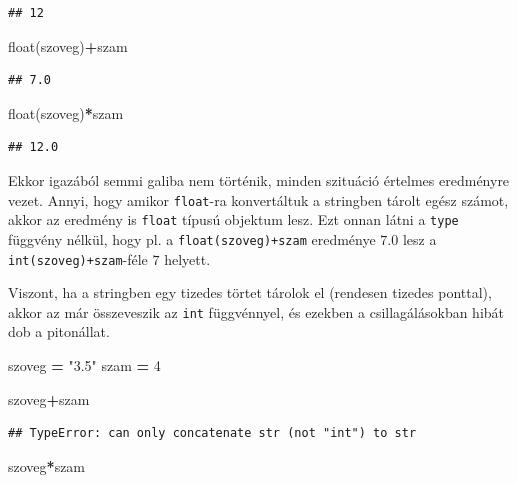 \documentclass[
]{book}
\newenvironment{Shaded}{\begin{snugshade}}{\end{snugshade}}
\newcommand{\BuiltInTok}[1]{#1}
\newcommand{\DecValTok}[1]{\textcolor[rgb]{0.00,0.00,0.81}{#1}}
\newcommand{\NormalTok}[1]{#1}
\newcommand{\OperatorTok}[1]{\textcolor[rgb]{0.81,0.36,0.00}{\textbf{#1}}}
\newcommand{\StringTok}[1]{\textcolor[rgb]{0.31,0.60,0.02}{#1}}
\begin{document}
\begin{verbatim}
## 12
\end{verbatim}

\begin{Shaded}
\begin{Highlighting}[]
\BuiltInTok{float}\NormalTok{(szoveg)}\OperatorTok{+}\NormalTok{szam}
\end{Highlighting}
\end{Shaded}

\begin{verbatim}
## 7.0
\end{verbatim}

\begin{Shaded}
\begin{Highlighting}[]
\BuiltInTok{float}\NormalTok{(szoveg)}\OperatorTok{*}\NormalTok{szam}
\end{Highlighting}
\end{Shaded}

\begin{verbatim}
## 12.0
\end{verbatim}

Ekkor igazából semmi galiba nem történik, minden szituáció értelmes eredményre vezet. Annyi, hogy amikor \texttt{float}-ra konvertáltuk a stringben tárolt egész számot, akkor az eredmény is \texttt{float} típusú objektum lesz. Ezt onnan látni a \texttt{type} függvény nélkül, hogy pl. a \texttt{float(szoveg)+szam} eredménye \(7.0\) lesz a \texttt{int(szoveg)+szam}-féle \(7\) helyett.

Viszont, ha a stringben egy tizedes törtet tárolok el (rendesen tizedes ponttal), akkor az már összeveszik az \texttt{int} függvénnyel, és ezekben a csillagálásokban hibát dob a pitonállat.

\begin{Shaded}
\begin{Highlighting}[]
\NormalTok{szoveg }\OperatorTok{=} \StringTok{"3.5"}
\NormalTok{szam }\OperatorTok{=} \DecValTok{4}

\NormalTok{szoveg}\OperatorTok{+}\NormalTok{szam}
\end{Highlighting}
\end{Shaded}

\begin{verbatim}
## TypeError: can only concatenate str (not "int") to str
\end{verbatim}

\begin{Shaded}
\begin{Highlighting}[]
\NormalTok{szoveg}\OperatorTok{*}\NormalTok{szam}
\end{Highlighting}
\end{Shaded}
\end{document}
